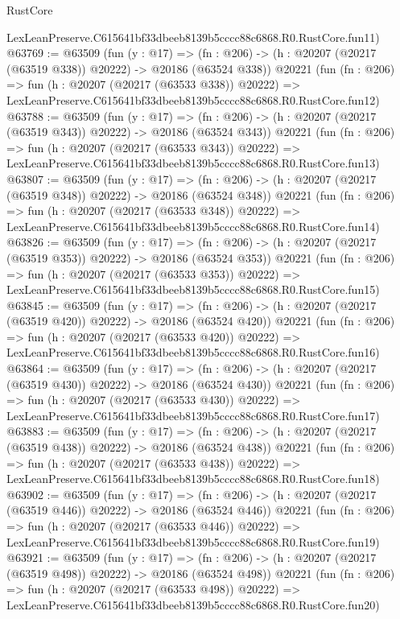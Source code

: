 \begin{lexlean}{RustCore}
\begin{coremodule}
    LexLeanPreserve.C615641bf33dbeeb8139b5cccc88c6868.R0.RustCore.fun11)
@63769 := @63509
    (fun (y : @17) =>
    (fn : @206) -> (h : @20207 (@20217 (@63519 @338)) @20222) -> @20186 (@63524 @338))
    @20221
    (fun (fn : @206) =>
    fun (h : @20207 (@20217 (@63533 @338)) @20222) =>
    LexLeanPreserve.C615641bf33dbeeb8139b5cccc88c6868.R0.RustCore.fun12)
@63788 := @63509
    (fun (y : @17) =>
    (fn : @206) -> (h : @20207 (@20217 (@63519 @343)) @20222) -> @20186 (@63524 @343))
    @20221
    (fun (fn : @206) =>
    fun (h : @20207 (@20217 (@63533 @343)) @20222) =>
    LexLeanPreserve.C615641bf33dbeeb8139b5cccc88c6868.R0.RustCore.fun13)
@63807 := @63509
    (fun (y : @17) =>
    (fn : @206) -> (h : @20207 (@20217 (@63519 @348)) @20222) -> @20186 (@63524 @348))
    @20221
    (fun (fn : @206) =>
    fun (h : @20207 (@20217 (@63533 @348)) @20222) =>
    LexLeanPreserve.C615641bf33dbeeb8139b5cccc88c6868.R0.RustCore.fun14)
@63826 := @63509
    (fun (y : @17) =>
    (fn : @206) -> (h : @20207 (@20217 (@63519 @353)) @20222) -> @20186 (@63524 @353))
    @20221
    (fun (fn : @206) =>
    fun (h : @20207 (@20217 (@63533 @353)) @20222) =>
    LexLeanPreserve.C615641bf33dbeeb8139b5cccc88c6868.R0.RustCore.fun15)
@63845 := @63509
    (fun (y : @17) =>
    (fn : @206) -> (h : @20207 (@20217 (@63519 @420)) @20222) -> @20186 (@63524 @420))
    @20221
    (fun (fn : @206) =>
    fun (h : @20207 (@20217 (@63533 @420)) @20222) =>
    LexLeanPreserve.C615641bf33dbeeb8139b5cccc88c6868.R0.RustCore.fun16)
@63864 := @63509
    (fun (y : @17) =>
    (fn : @206) -> (h : @20207 (@20217 (@63519 @430)) @20222) -> @20186 (@63524 @430))
    @20221
    (fun (fn : @206) =>
    fun (h : @20207 (@20217 (@63533 @430)) @20222) =>
    LexLeanPreserve.C615641bf33dbeeb8139b5cccc88c6868.R0.RustCore.fun17)
@63883 := @63509
    (fun (y : @17) =>
    (fn : @206) -> (h : @20207 (@20217 (@63519 @438)) @20222) -> @20186 (@63524 @438))
    @20221
    (fun (fn : @206) =>
    fun (h : @20207 (@20217 (@63533 @438)) @20222) =>
    LexLeanPreserve.C615641bf33dbeeb8139b5cccc88c6868.R0.RustCore.fun18)
@63902 := @63509
    (fun (y : @17) =>
    (fn : @206) -> (h : @20207 (@20217 (@63519 @446)) @20222) -> @20186 (@63524 @446))
    @20221
    (fun (fn : @206) =>
    fun (h : @20207 (@20217 (@63533 @446)) @20222) =>
    LexLeanPreserve.C615641bf33dbeeb8139b5cccc88c6868.R0.RustCore.fun19)
@63921 := @63509
    (fun (y : @17) =>
    (fn : @206) -> (h : @20207 (@20217 (@63519 @498)) @20222) -> @20186 (@63524 @498))
    @20221
    (fun (fn : @206) =>
    fun (h : @20207 (@20217 (@63533 @498)) @20222) =>
    LexLeanPreserve.C615641bf33dbeeb8139b5cccc88c6868.R0.RustCore.fun20)

\end{coremodule}
\end{lexlean}
